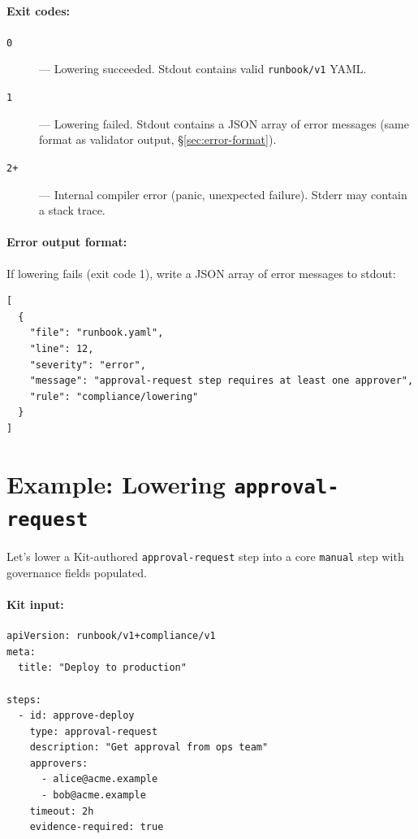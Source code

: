 \paragraph{Exit codes:}

\begin{description}
  \item[\texttt{0}] --- Lowering succeeded. Stdout contains valid
    \texttt{runbook/v1} YAML.
  \item[\texttt{1}] --- Lowering failed. Stdout contains a JSON array of error
    messages (same format as validator output, \S\ref{sec:error-format}).
  \item[\texttt{2+}] --- Internal compiler error (panic, unexpected failure).
    Stderr may contain a stack trace.
\end{description}

\paragraph{Error output format:}

If lowering fails (exit code 1), write a JSON array of error messages to stdout:

\begin{verbatim}
[
  {
    "file": "runbook.yaml",
    "line": 12,
    "severity": "error",
    "message": "approval-request step requires at least one approver",
    "rule": "compliance/lowering"
  }
]
\end{verbatim}

\section{Example: Lowering \texttt{approval-request}}
\label{sec:example-lowering}

Let's lower a Kit-authored \texttt{approval-request} step into a core
\texttt{manual} step with governance fields populated.

\paragraph{Kit input:}

\begin{verbatim}
apiVersion: runbook/v1+compliance/v1
meta:
  title: "Deploy to production"

steps:
  - id: approve-deploy
    type: approval-request
    description: "Get approval from ops team"
    approvers:
      - alice@acme.example
      - bob@acme.example
    timeout: 2h
    evidence-required: true
\end{verbatim}

